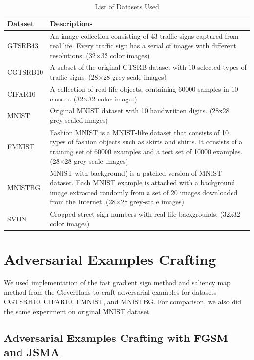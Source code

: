 \documentclass{article}
\begin{document}
\begin{table}[htb]
    \centering
    \begin{tabular}{ | C{0.15\textwidth} | C{0.83\textwidth} | }
    \toprule
    Dataset & Descriptions \\
    \midrule
    GTSRB43 & An image collection consisting of 43 traffic signs captured from real life. Every traffic sign has a serial of images with different resolutions. (32$\times$32 color images) \\ \midrule
    CGTSRB10 & A subset of the original GTSRB\cite{gtsrb} dataset with 10 selected types of traffic signs. (28$\times$28 grey-scale images) \\ \midrule
    CIFAR10 & A collection of real-life objects\cite{cifar10}, containing 60000 samples in 10 classes. (32$\times$32 color images) \\ \midrule
    MNIST & Original MNIST\cite{mnist} dataset with 10 handwritten digits. (28x28 grey-scaled images) \\ \midrule
    FMNIST & Fashion MNIST\cite{fmnist} is a MNIST-like dataset that consists of 10 types of fashion objects such as skirts and shirts. It consists of a training set of 60000 examples and a test set of 10000 examples. (28$\times$28 grey-scale images) \\ \midrule
    MNISTBG & MNIST with background)\cite{mnistbg} is a patched version of MNIST dataset. Each MNIST example is attached with a background image extracted randomly from a set of 20 images downloaded from the Internet. (28$\times$28 grey-scale images) \\ \midrule
    SVHN & Cropped street sign numbers with real-life backgrounds\cite{svhn}. (32x32 color images) \\
    \bottomrule
    \end{tabular}
    \caption{\label{tab:datasetused} List of Datasets Used}
\end{table}

\section{Adversarial Examples Crafting}

We used implementation of the fast gradient sign method and saliency map method from the CleverHans\cite{cleverhans} to craft
adversarial examples for datasets CGTSRB10, CIFAR10, FMNIST, and MNISTBG.
For comparison, we also did the same experiment on original MNIST dataset.


\subsection{Adversarial Examples Crafting with FGSM and JSMA}
\end{document}
